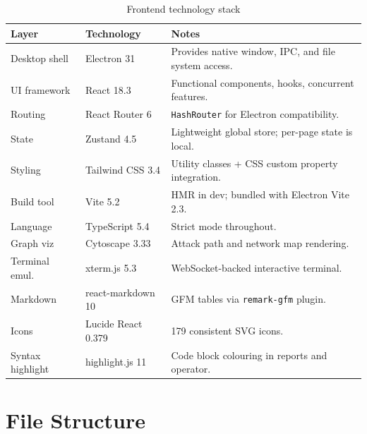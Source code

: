 \documentclass[11pt,a4paper,twoside,openright]{book}
\begin{document}
\begin{table}[H]
\centering
\begin{tabularx}{\textwidth}{L{3.5cm} L{3cm} X}
\toprule
\textbf{Layer} & \textbf{Technology} & \textbf{Notes} \\
\midrule
Desktop shell    & Electron 31           & Provides native window, IPC, and file system access. \\
UI framework     & React 18.3            & Functional components, hooks, concurrent features. \\
Routing          & React Router 6        & \texttt{HashRouter} for Electron compatibility. \\
State            & Zustand 4.5           & Lightweight global store; per-page state is local. \\
Styling          & Tailwind CSS 3.4      & Utility classes + CSS custom property integration. \\
Build tool       & Vite 5.2              & HMR in dev; bundled with Electron Vite 2.3. \\
Language         & TypeScript 5.4        & Strict mode throughout. \\
Graph viz        & Cytoscape 3.33        & Attack path and network map rendering. \\
Terminal emul.   & xterm.js 5.3          & WebSocket-backed interactive terminal. \\
Markdown         & react-markdown 10     & GFM tables via \texttt{remark-gfm} plugin. \\
Icons            & Lucide React 0.379    & 179 consistent SVG icons. \\
Syntax highlight & highlight.js 11       & Code block colouring in reports and operator. \\
\bottomrule
\end{tabularx}
\caption{Frontend technology stack}
\end{table}

\section{File Structure}
\end{document}

